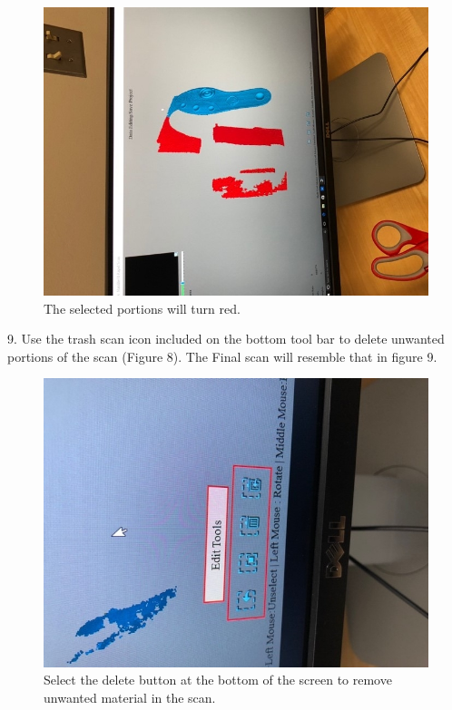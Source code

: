\begin{figure}[!htp]
\centering
\includegraphics[scale=.75, angle=270]{3D_Crop_2}
\caption{The selected portions will turn red.}
\label{Image 7}
\end{figure}

\newpage

9. Use the trash scan icon included on the bottom tool bar to delete unwanted portions of the scan (Figure 8). The Final scan will resemble that in figure 9.

\begin{figure}[!htp]
\centering
\includegraphics[scale=1, angle=270]{3D_Tools}
\caption{Select the delete button at the bottom of the screen to remove unwanted material in the scan. }
\label{Image 8}
\end{figure}

